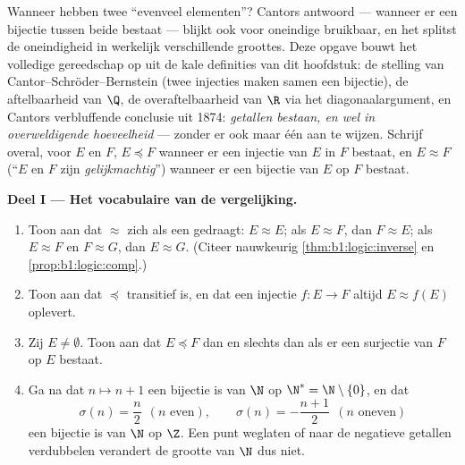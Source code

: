 \begin{problem}\label{pb:b1:logic:1}
Wanneer hebben twee  ``evenveel elementen''? Cantors
antwoord --- wanneer er een bijectie tussen beide bestaat --- blijkt ook
voor oneindige  bruikbaar, en het splitst de oneindigheid in
werkelijk verschillende groottes. Deze opgave bouwt het volledige
gereedschap op uit de kale definities van dit hoofdstuk: de stelling van
Cantor--Schröder--Bernstein (twee injecties maken samen een bijectie),
de aftelbaarheid van $\Q$, de overaftelbaarheid van $\R$ via het
diagonaalargument, en Cantors verbluffende conclusie uit 1874:
\emph{ getallen bestaan, en wel in overweldigende
hoeveelheid} --- zonder er ook maar één aan te wijzen.
Schrijf overal, voor  $E$ en $F$, $E \preceq F$ wanneer er
een injectie van $E$ in $F$ bestaat, en $E \approx F$ (``$E$ en $F$ zijn
\emph{gelijkmachtig}'') wanneer er een bijectie van $E$ op $F$ bestaat.

\medskip
\noindent\textbf{Deel I --- Het vocabulaire van de vergelijking.}
\begin{enumerate}
  \item Toon aan dat $\approx$ zich als een  gedraagt:
        $E \approx E$; als $E \approx F$, dan $F \approx E$; als $E
        \approx F$ en $F \approx G$, dan $E \approx G$. (Citeer
        nauwkeurig \cref{thm:b1:logic:inverse} en
        \cref{prop:b1:logic:comp}.)
  \item Toon aan dat $\preceq$ transitief is, en dat een injectie $f
        \colon E \to F$ altijd $E \approx f(E)$ oplevert.
  \item Zij $E \neq \emptyset$. Toon aan dat $E \preceq F$ dan en slechts
        dan als er een surjectie van $F$ op $E$ bestaat.
  \item Ga na dat $n \mapsto n + 1$ een bijectie is van $\N$ op $\N^* =
        \N \setminus \{0\}$, en dat
        \[
        \sigma(n) = \frac n2 \ \ (n \text{ even}), \qquad
        \sigma(n) = -\frac{n+1}2 \ \ (n \text{ oneven})
        \]
        een bijectie is van $\N$ op $\Z$. Een punt weglaten of naar de
        negatieve getallen verdubbelen verandert de grootte van $\N$ dus
        niet.
\end{enumerate}


\end{problem}
